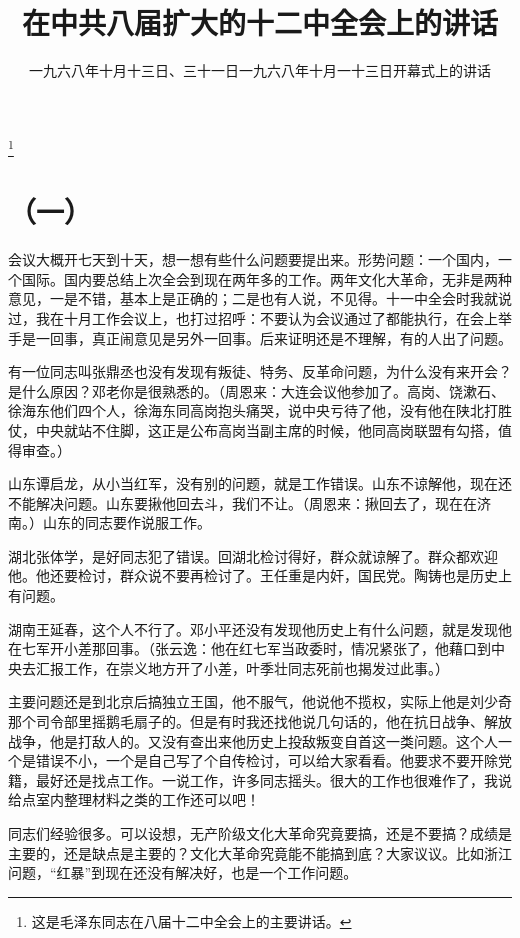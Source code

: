 
\title{在中共八届扩大的十二中全会上的讲话}
\date{一九六八年十月十三日、三十一日}
\thanks{这是毛泽东同志在八届十二中全会上的主要讲话。}
\maketitle

\date{一九六八年十月一十三日开幕式上的讲话}
\section*{（一）}

会议大概开七天到十天，想一想有些什么问题要提出来。形势问题：一个国内，一个国际。国内要总结上次全会到现在两年多的工作。两年文化大革命，无非是两种意见，一是不错，基本上是正确的；二是也有人说，不见得。十一中全会时我就说过，我在十月工作会议上，也打过招呼：不要认为会议通过了都能执行，在会上举手是一回事，真正闹意见是另外一回事。后来证明还是不理解，有的人出了问题。

有一位同志叫张鼎丞也没有发现有叛徒、特务、反革命问题，为什么没有来开会？是什么原因？邓老你是很熟悉的。（周恩来：大连会议他参加了。高岗、饶漱石、徐海东他们四个人，徐海东同高岗抱头痛哭，说中央亏待了他，没有他在陕北打胜仗，中央就站不住脚，这正是公布高岗当副主席的时候，他同高岗联盟有勾搭，值得审查。）

山东谭启龙，从小当红军，没有别的问题，就是工作错误。山东不谅解他，现在还不能解决问题。山东要揪他回去斗，我们不让。（周恩来：揪回去了，现在在济南。）山东的同志要作说服工作。

湖北张体学，是好同志犯了错误。回湖北检讨得好，群众就谅解了。群众都欢迎他。他还要检讨，群众说不要再检讨了。王任重是内奸，国民党。陶铸也是历史上有问题。

湖南王延春，这个人不行了。邓小平还没有发现他历史上有什么问题，就是发现他在七军开小差那回事。（张云逸：他在红七军当政委时，情况紧张了，他藉口到中央去汇报工作，在崇义地方开了小差，叶季壮同志死前也揭发过此事。）

主要问题还是到北京后搞独立王国，他不服气，他说他不揽权，实际上他是刘少奇那个司令部里摇鹅毛扇子的。但是有时我还找他说几句话的，他在抗日战争、解放战争，他是打敌人的。又没有查出来他历史上投敌叛变自首这一类问题。这个人一个是错误不小，一个是自己写了个自传检讨，可以给大家看看。他要求不要开除党籍，最好还是找点工作。一说工作，许多同志摇头。很大的工作也很难作了，我说给点室内整理材料之类的工作还可以吧！

同志们经验很多。可以设想，无产阶级文化大革命究竟要搞，还是不要搞？成绩是主要的，还是缺点是主要的？文化大革命究竟能不能搞到底？大家议议。比如浙江问题，“红暴”到现在还没有解决好，也是一个工作问题。

